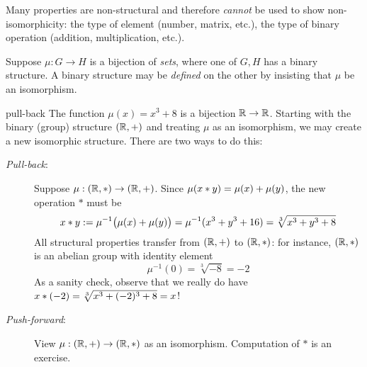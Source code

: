 Many properties are non-structural and therefore \emph{cannot} be used to show non-isomorphicity: the type of element (number, matrix, etc.), the type of binary operation (addition, multiplication, etc.).




Suppose $\mu:G\to H$ is a bijection of \emph{sets}, where one of $G,H$ has a binary structure. A binary structure may be \emph{defined} on the other by insisting that $\mu$ be an isomorphism.

\begin{example}{}{pull-back}
  The function $\mu(x)=x^3+8$ is a bijection $\mathbb{R}\to\mathbb{R}$. Starting with the binary (group) structure $(\mathbb{R},+)$ and treating $\mu$ as an isomorphism, we may create a new isomorphic structure. There are two ways to do this:
  \begin{description}
  	\item[\emph{Pull-back}:] Suppose $\mu:(\mathbb{R},*)\to (\mathbb{R},+)$. Since $\mu(x\mathbin{\ast} y)=\mu(x)+\mu(y)$, the new operation $\ast$ must be
			\[
				x\mathbin{\ast} y:=\mu^{-1}\bigl(\mu(x)+\mu(y)\bigr) 
				=\mu^{-1}(x^3+y^3+16) 
				=\sqrt[3]{x^3+y^3+8}
			\]
			All structural properties transfer from $(\mathbb{R},+)$ to $(\mathbb{R},*)$: for instance, $(\mathbb{R},*)$ is an abelian group with identity element
			\[
				\mu^{-1}(0)=\sqrt[3]{-8}=-2
			\]
			As a sanity check, observe that we really do have $x\mathbin{\ast} (-2)=\sqrt[3]{x^3+(-2)^3+8}=x$!
			\item[\emph{Push-forward}:] View $\mu:(\mathbb{R},+)\to (\mathbb{R},*)$ as an isomorphism. Computation of $*$ is an exercise.
  \end{description} 
\end{example}




